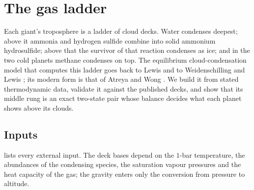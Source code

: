 \documentclass[11pt]{article}
\theoremstyle{definition}\newtheorem{definition}[theorem]{Definition}
\theoremstyle{remark}\newtheorem{remark}[theorem]{Remark}
\begin{document}
\section{The gas ladder}\label{sec:ladder}
Each giant's troposphere is a ladder of cloud decks. Water condenses deepest; above it ammonia and hydrogen sulfide combine into solid ammonium hydrosulfide; above that the survivor of that reaction condenses as ice; and in the two cold planets methane condenses on top. The equilibrium cloud-condensation model that computes this ladder goes back to Lewis and to Weidenschilling and Lewis \cite{Lewis1969,WL73}; its modern form is that of Atreya and Wong \cite{AtreyaWong}. We build it from stated thermodynamic data, validate it against the published decks, and show that its middle rung is an exact two-state pair whose balance decides what each planet shows above its clouds.

\subsection{Inputs}\label{sec:ladderinputs}
 lists every external input. The deck bases depend on the $1$-bar temperature, the abundances of the condensing species, the saturation vapour pressures and the heat capacity of the gas; the gravity enters only the conversion from pressure to altitude.
\end{document}
